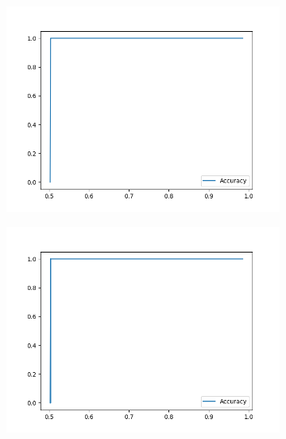 \begin{figure}

    \begin{subfigure}{0.475\linewidth}
        \includegraphics[scale=0.275]{figs/mnist_2_256_prop_0_0.03_samples.png}
        \caption{}
        \label{f:mnist-prop-samples}
    \end{subfigure}
    \begin{subfigure}{0.475\linewidth}
        \includegraphics[scale=0.275]{figs/mnist_2_256_prop_0_0.03_pgd.png}
        \caption{}
        \label{f:mnist-prop-pgd}
    \end{subfigure}


\end{figure}
